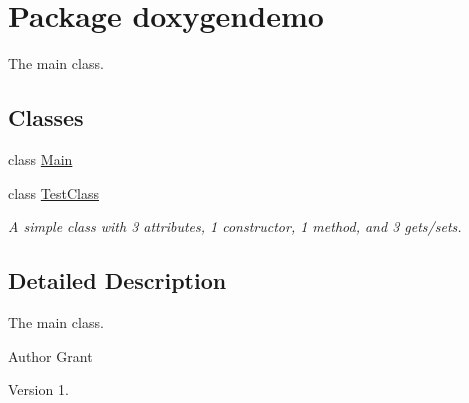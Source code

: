 \hypertarget{namespacedoxygendemo}{}\section{Package doxygendemo}
\label{namespacedoxygendemo}


The main class.  


\subsection*{Classes}
\begin{DoxyCompactItemize}
\item 
class \hyperlink{classdoxygendemo_1_1_main}{Main}
\item 
class \hyperlink{classdoxygendemo_1_1_test_class}{Test\+Class}
\begin{DoxyCompactList}\small\item\em A simple class with 3 attributes, 1 constructor, 1 method, and 3 gets/sets. \end{DoxyCompactList}\end{DoxyCompactItemize}


\subsection{Detailed Description}
The main class. 

\begin{DoxyAuthor}{Author}
Grant 
\end{DoxyAuthor}
\begin{DoxyVersion}{Version}
1. 
\end{DoxyVersion}
